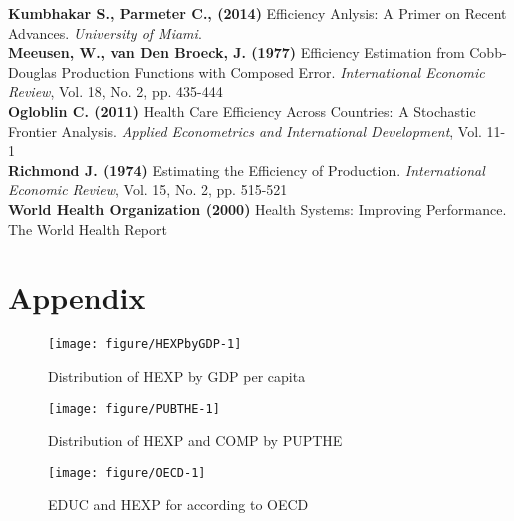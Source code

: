 \documentclass[12pt,a4paper]{article}\usepackage[]{graphicx}\usepackage[]{color}
\begin{document}
\textbf{Kumbhakar S., Parmeter C., (2014)} Efficiency Anlysis: A Primer on Recent Advances. \textit{University of Miami}. \\

\textbf{Meeusen, W., van Den Broeck, J. (1977)} Efficiency Estimation from Cobb-Douglas Production Functions with Composed Error. \textit{International Economic Review}, Vol. 18, No. 2, pp. 435-444 \\

\textbf{Ogloblin C. (2011)} Health Care Efficiency Across Countries: A Stochastic Frontier Analysis. \textit{Applied Econometrics and International Development}, Vol. 11-1 \\

\textbf{Richmond J. (1974)} Estimating the Efficiency of Production. \textit{International Economic Review}, Vol. 15, No. 2, pp. 515-521 \\

\textbf{World Health Organization (2000)} Health Systems: Improving Performance. The World Health Report



\newpage
\section{Appendix}
\begin{figure}[!htbp]

{\centering \texttt{[image: figure/HEXPbyGDP-1]} 

}

\caption[Distribution of HEXP by GDP per capita]{Distribution of HEXP by GDP per capita}\label{fig:HEXPbyGDP}
\end{figure}


\begin{figure}[!htbp]

{\centering \texttt{[image: figure/PUBTHE-1]} 

}

\caption[Distribution of HEXP and COMP by PUPTHE]{Distribution of HEXP and COMP by PUPTHE}\label{fig:PUBTHE}
\end{figure}


\begin{figure}[!htbp]

{\centering \texttt{[image: figure/OECD-1]} 

}

\caption[EDUC and HEXP for according to OECD]{EDUC and HEXP for according to OECD}\label{fig:OECD}
\end{figure}
\end{document}
